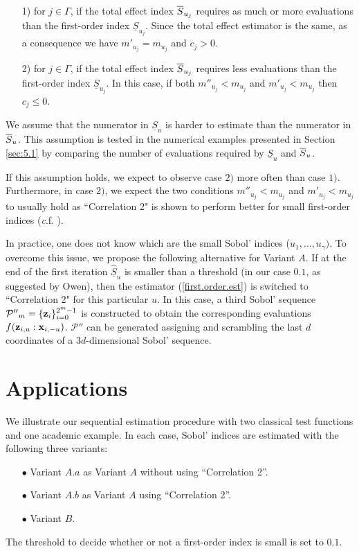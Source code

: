 \begin{itemize}
\item[1)] for $j \in \Gamma$, if the total effect index $\ov{$S$}_{u_j}$ requires as much or more evaluations than the first-order index $\underline{S}_{u_j}$. Since the total effect estimator is the same, as a consequence we have $m'_{u_j}=m_{u_j}$ and $c_j >0$.
\item[2)] for $j \in \Gamma$, if the total effect index $\ov{$S$}_{u_j}$ requires less evaluations than the first-order index $\underline{S}_{u_j}$. In this case, if both $m''_{u_j} < m_{u_j}$ and $m'_{u_j} < m_{u_j}$ then $c_j \leq 0$.  
\end{itemize}
We assume that the numerator in $\underline{S}_u$ is harder to estimate than the numerator in $\ov{$S$}_u$. This assumption is tested in the numerical examples presented in Section \ref{sec:5.1} by comparing the number of evaluations required by $\underline{S}_u$ and $\ov{$S$}_u$. 

If this assumption holds, we expect to observe case $2)$ more often than case $1)$. Furthermore, in case $2)$, we expect the two conditions $m''_{u_j} < m_{u_j}$ and $m'_{u_j} < m_{u_j}$ to usually hold as ``Correlation 2" is shown to perform better for small first-order indices (\textit c.f. \cite{Owen}).
\bigskip

In practice, one does not know which are the small Sobol' indices ($u_1,\dots,u_\gamma)$. To overcome this issue, we propose the following alternative for Variant $A$. If at the end of the first iteration $\widehat{\underline{S}}_u$ is smaller than a threshold (in our case $0.1$, as suggested by Owen), then the estimator (\ref{first.order.est}) is switched to ``Correlation 2" for this particular $u$. In this case, a third Sobol' sequence $\mathcal{P''}_{m}=\{\boldsymbol{\mathbf{z}}_i\}_{i=0}^{2^m-1}$ is constructed to obtain the corresponding evaluations $f({\boldsymbol{\mathbf{z}}}_{i,u}:{\boldsymbol{\mathbf{x}}}_{i,-u})$. $\mathcal{P''}$ can be generated assigning and scrambling the last $d$ coordinates of a $3d$-dimensional Sobol' sequence.

\section{Applications}
\label{sec:5}

We illustrate our sequential estimation procedure with two classical test functions and one academic example. In each case, Sobol' indices are estimated with the following three variants:
\begin{itemize}
\item[$\bullet$] Variant $A.a$ as Variant $A$ without using ``Correlation 2''. 
\item[$\bullet$] Variant $A.b$ as Variant $A$ using ``Correlation 2''.
\item[$\bullet$] Variant $B$.
\end{itemize}
The threshold to decide whether or not a first-order index is small is set to $0.1$. 

